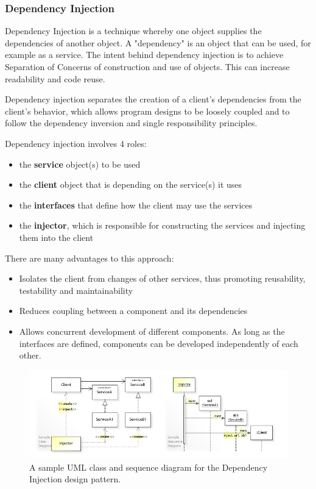 \subsubsection{Dependency Injection}
Dependency Injection is a technique whereby one object supplies the dependencies of another object. A "dependency" is an object that can be used, for example as a service. The intent behind dependency injection is to achieve Separation of Concerns of construction and use of objects. This can increase readability and code reuse.

Dependency injection separates the creation of a client's dependencies from the client's behavior, which allows program designs to be loosely coupled and to follow the dependency inversion and single responsibility principles.

Dependency injection involves 4 roles:
\begin{itemize}
\item the \textbf{service} object(s) to be used
\item the \textbf{client} object that is depending on the service(s) it uses
\item the \textbf{interfaces} that define how the client may use the services
\item the \textbf{injector}, which is responsible for constructing the services and injecting them into the client
\end{itemize}
There are many advantages to this approach:
\begin{itemize}
\item Isolates the client from changes of other services, thus promoting reusability, testability and maintainability
\item Reduces coupling between a component and its dependencies
\item Allows concurrent development of different components. As long as the interfaces are defined, components can be developed independently of each other.
\end{itemize}

\begin{figure}[!h]
	\centering
	\includegraphics[scale=0.55]{Picture/server/di.jpg}
	\caption{A sample UML class and sequence diagram for the Dependency Injection design pattern. }
\label{fig:di}
\end{figure}


